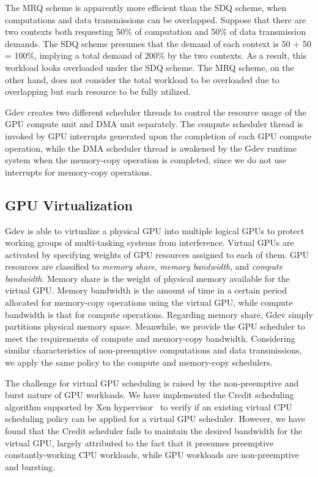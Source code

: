 The MRQ scheme is apparently more efficient than the SDQ scheme, when
computations and data transmissions can be overlapped.
Suppose that there are two contexts both requesting 50\% of computation
and 50\% of data transmission demands.
The SDQ scheme presumes that the demand of each context is 50 + 50 =
100\%, implying a total demand of 200\% by the two contexts.
As a result, this workload looks overloaded under the SDQ scheme.
The MRQ scheme, on the other hand, does not consider the total workload
to be overloaded due to overlapping but each resource to be fully utilized.

Gdev creates two different scheduler threads to control the resource
usage of the GPU compute unit and DMA unit separately.
The compute scheduler thread is invoked by GPU interrupts generated upon
the completion of each GPU compute operation, while the DMA scheduler
thread is awakened by the Gdev runtime system when the memory-copy operation is
completed, since we do not use interrupts for memory-copy operations.

\subsection{GPU Virtualization}
\label{sec:virtual_gpu}
\vspace{-0.25em}

Gdev is able to virtualize a physical GPU into multiple logical GPUs to
protect working groups of multi-tasking systems from interference.
Virtual GPUs are activated by specifying weights of GPU resources
assigned to each of them.
GPU resources are classified to \textit{memory share}, \textit{memory
bandwidth}, and \textit{compute bandwidth}.
Memory share is the weight of physical memory available for the
virtual GPU.
Memory bandwidth is the amount of time in a certain period allocated for
memory-copy operations using the virtual GPU, while compute
bandwidth is that for compute operations.
Regarding memory share, Gdev simply partitions physical memory space.
Meanwhile, we provide the GPU scheduler to meet the requirements
of compute and memory-copy bandwidth.
Considering similar characteristics of non-preemptive computations and
data transmissions, we apply the same policy to the compute and
memory-copy schedulers.

The challenge for virtual GPU scheduling is raised by the non-preemptive
and burst nature of GPU workloads.
We have implemented the Credit scheduling algorithm supported by Xen
hypervisor~\cite{Barham_SOSP03} to verify if an existing virtual CPU
scheduling policy can be applied for a virtual GPU scheduler.
However, we have found that the Credit scheduler fails to maintain the
desired bandwidth for the virtual GPU, largely attributed to the fact
that it presumes preemptive constantly-working CPU workloads, while GPU
workloads are non-preemptive and bursting.


